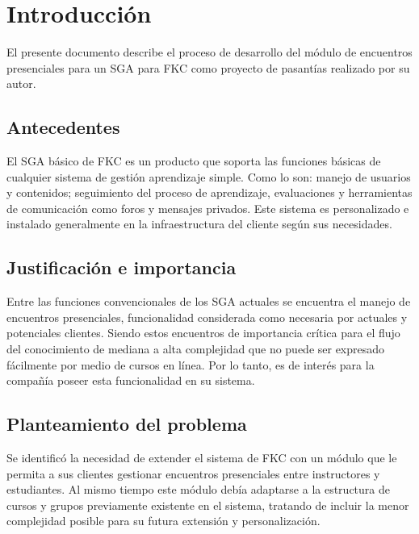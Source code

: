 \chapter*{Introducción}
\thispagestyle{empty} %
 
El presente documento describe el proceso de desarrollo del módulo de encuentros presenciales para un \gls{SGA} para \gls{FKC} como proyecto de pasantías realizado por su autor.

\section*{Antecedentes}
El \gls{SGA} básico de \gls{FKC} es un producto que soporta las funciones básicas de cualquier sistema de gestión aprendizaje simple. Como lo son: manejo de usuarios y contenidos; seguimiento del proceso de aprendizaje, evaluaciones y herramientas de comunicación como foros y mensajes privados. Este sistema es personalizado e instalado generalmente en la infraestructura del cliente según sus necesidades.

\section*{Justificación e importancia}
Entre las funciones convencionales de los \gls{SGA} actuales se encuentra el manejo de encuentros presenciales, funcionalidad considerada como necesaria por actuales y potenciales clientes. Siendo estos encuentros de importancia crítica para el flujo del conocimiento de mediana a alta complejidad que no puede ser expresado fácilmente por medio de cursos en línea. Por lo tanto, es de interés para la compañía poseer esta funcionalidad en su sistema.


\section*{Planteamiento del problema}
Se identificó la necesidad de extender el sistema de \gls{FKC} con un módulo que le permita a sus clientes gestionar encuentros presenciales entre instructores y estudiantes. Al mismo tiempo este módulo debía adaptarse a la estructura de cursos y grupos previamente existente en el sistema, tratando de incluir la menor complejidad posible para su futura extensión y personalización.


